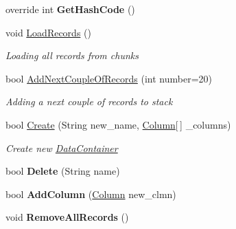 \begin{DoxyCompactItemize}
\item 
\hypertarget{class_dwarf_d_b_1_1_data_structures_1_1_data_container_a5f7fad1592467a438632e9351ec124fa}{override int {\bfseries Get\+Hash\+Code} ()}\label{class_dwarf_d_b_1_1_data_structures_1_1_data_container_a5f7fad1592467a438632e9351ec124fa}

\item 
void \hyperlink{class_dwarf_d_b_1_1_data_structures_1_1_data_container_aa5a712b9a8923f2d57278b58d46d6927}{Load\+Records} ()
\begin{DoxyCompactList}\small\item\em Loading all records from chunks \end{DoxyCompactList}\item 
bool \hyperlink{class_dwarf_d_b_1_1_data_structures_1_1_data_container_ac2f044ee93ae6a4ba25b0deb9333867e}{Add\+Next\+Couple\+Of\+Records} (int number=20)
\begin{DoxyCompactList}\small\item\em Adding a next couple of records to stack \end{DoxyCompactList}\item 
bool \hyperlink{class_dwarf_d_b_1_1_data_structures_1_1_data_container_accdc07066ac67d50fe891f8768e734b9}{Create} (String new\+\_\+name, \hyperlink{class_dwarf_d_b_1_1_data_structures_1_1_column}{Column}\mbox{[}$\,$\mbox{]} \+\_\+columns)
\begin{DoxyCompactList}\small\item\em Create new \hyperlink{class_dwarf_d_b_1_1_data_structures_1_1_data_container}{Data\+Container} \end{DoxyCompactList}\item 
\hypertarget{class_dwarf_d_b_1_1_data_structures_1_1_data_container_acee585ee5f3d45fe8474a03d533e9119}{bool {\bfseries Delete} (String name)}\label{class_dwarf_d_b_1_1_data_structures_1_1_data_container_acee585ee5f3d45fe8474a03d533e9119}

\item 
\hypertarget{class_dwarf_d_b_1_1_data_structures_1_1_data_container_a8e38284dde8d76439d691723da7f80fb}{bool {\bfseries Add\+Column} (\hyperlink{class_dwarf_d_b_1_1_data_structures_1_1_column}{Column} new\+\_\+clmn)}\label{class_dwarf_d_b_1_1_data_structures_1_1_data_container_a8e38284dde8d76439d691723da7f80fb}

\item 
\hypertarget{class_dwarf_d_b_1_1_data_structures_1_1_data_container_a1430289cc6995618a055ff537c7c0d4e}{void {\bfseries Remove\+All\+Records} ()}\label{class_dwarf_d_b_1_1_data_structures_1_1_data_container_a1430289cc6995618a055ff537c7c0d4e}


\end{DoxyCompactItemize}
